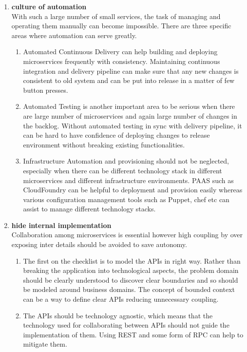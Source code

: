 \begin{enumerate}
\item \textbf{culture of automation}\\
With such a large number of small services, the task of managing and operating them manually can become impossible. There are three specific areas where automation can serve greatly.
\begin{enumerate}
\item Automated Continuous Delivery can help building and deploying microservices frequently with consistency. Maintaining continuous integration and delivery pipeline can make sure that any new changes is consistent to old system and can be put into release in a matter of few button presses.
\item Automated Testing is another important area to be serious when there are large number of microservices and again large number of changes in the backlog. Without automated testing in sync with delivery pipeline, it can be hard to have confidence of deploying changes to release environment without breaking existing functionalities.
\item Infrastructure Automation and provisioning should not be neglected, especially when there can be different technology stack in different microservices and different infrastructure environments. \acrshort{PAAS} such as CloudFoundry can be helpful to deployment and provision easily whereas various configuration management tools such as Puppet, chef etc can assist to manage different technology stacks.
\end{enumerate}
\item \textbf{hide internal implementation}\\
Collaboration among microservices is essential however high coupling by over exposing inter details should be avoided to save autonomy.
\begin{enumerate}
\item The first on the checklist is to model the \acrshort{API}s in right way. Rather than breaking the application into technological aspects, the problem domain should be clearly understood to discover clear boundaries and so should be modeled around business domains. The concept of bounded context can be a way to define clear \acrshort{API}s reducing unnecessary coupling.
\item The \acrshort{API}s should be technology agnostic, which means that the technology used for collaborating between \acrshort{API}s should not guide the implementation of them. Using \acrshort{REST} and some form of \acrshort{RPC} can help to mitigate them.

\end{enumerate}
\end{enumerate}
